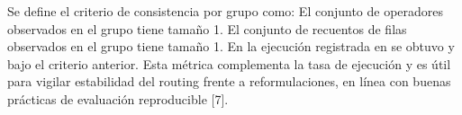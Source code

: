 \markdownRendererUlEndTight \markdownRendererInterblockSeparator
{}Se define el criterio de consistencia por grupo como:\markdownRendererInterblockSeparator
{}\markdownRendererUlBeginTight
\markdownRendererUlItem El conjunto de operadores observados en el grupo tiene tamaño 1.\markdownRendererUlItemEnd 
\markdownRendererUlItem El conjunto de recuentos de filas observados en el grupo tiene tamaño 1.\markdownRendererUlItemEnd 
\markdownRendererUlEndTight \markdownRendererInterblockSeparator
{}En la ejecución registrada en  se obtuvo  y  bajo el criterio anterior. Esta métrica complementa la tasa de ejecución y es útil para vigilar estabilidad del routing frente a reformulaciones, en línea con buenas prácticas de evaluación reproducible [7].\markdownRendererInterblockSeparator
